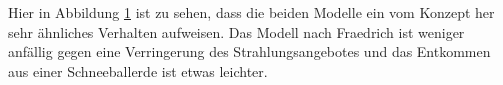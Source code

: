 \documentclass[]{report}
\begin{document}
\begin{figure}[h!] \centering \def\svgwidth{\columnwidth}  \caption{} \label{comp} \end{figure}

Hier in Abbildung \ref{comp} ist zu sehen, dass die beiden Modelle ein vom Konzept her sehr ähnliches Verhalten aufweisen. Das Modell nach Fraedrich ist weniger anfällig gegen eine Verringerung des Strahlungsangebotes und das Entkommen aus einer Schneeballerde ist etwas leichter.
\end{document}
